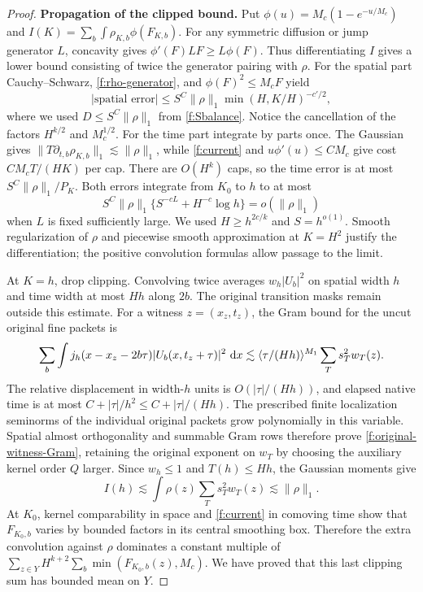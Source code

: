 \begin{proof}
\smallskip\noindent\textbf{Propagation of the clipped bound.}
Put $\phi(u)=M_c(1-e^{-u/M_c})$ and
$I(K)=\sum_b\int\rho_{K,b}\phi(F_{K,b})$. For any symmetric
diffusion or jump generator $L$, concavity gives
$\phi'(F)LF\ge L\phi(F)$. Thus differentiating $I$ gives a lower
bound consisting of twice the generator pairing with $\rho$.
For the spatial part Cauchy--Schwarz, \eqref{f:rho-generator}, and
$\phi(F)^2\le M_cF$ yield
\[
 |\text{spatial error}|
 \le S^C\|\rho\|_1\min(H,K/H)^{-c'/2},
\]
where we used $D\le S^C\|\rho\|_1$ from \eqref{f:Sbalance}.
Notice the cancellation of the factors $H^{k/2}$ and $M_c^{1/2}$.
For the time part integrate by parts once. The Gaussian gives
$\|T\partial_{t,b}\rho_{K,b}\|_1\lesssim\|\rho\|_1$, while
\eqref{f:current} and $u\phi'(u)\le CM_c$ give cost
$CM_cT/(HK)$ per cap. There are $O(H^k)$ caps, so the time error is
at most $S^C\|\rho\|_1/P_K$. Both errors integrate from $K_0$ to $h$
to at most
\[
 S^C\|\rho\|_1\{S^{-cL}+H^{-c}\log h\}=o(\|\rho\|_1)
\]
when $L$ is fixed sufficiently large. We used $H\ge h^{2c/k}$ and
$S=h^{o(1)}$. Smooth regularization of $\rho$ and piecewise smooth
approximation at $K=H^2$ justify the differentiation; the positive
convolution formulas allow passage to the limit.

At $K=h$, drop clipping. Convolving twice averages $w_h|U_b|^2$ on
spatial width $h$ and time width at most $Hh$ along $2b$. The original
transition masks remain outside this estimate. For a witness
$z=(x_z,t_z)$, the Gram bound for the uncut original fine packets is
\begin{equation}\label{f:original-witness-Gram}
 \sum_b\int j_h(x-x_z-2b\tau)|U_b(x,t_z+\tau)|^2\,\,\mathrm d x
 \lesssim\langle \tau/(Hh)\rangle^{M_1}\sum_Ts_T^2w_T(z).
\end{equation}
The relative displacement in width-$h$ units is $O(|\tau|/(Hh))$,
and elapsed native time is at most
$C+|\tau|/h^2\le C+|\tau|/(Hh)$. The prescribed finite localization
seminorms of the individual original packets grow polynomially in
this variable. Spatial almost orthogonality and summable Gram rows
therefore prove \eqref{f:original-witness-Gram}, retaining the original
exponent on $w_T$ by choosing the auxiliary kernel order $Q$ larger.
Since $w_h\le1$ and $T(h)\le Hh$, the Gaussian moments give
\[
 I(h)\lesssim\int\rho(z)\sum_Ts_T^2w_T(z)\lesssim\|\rho\|_1.
\]
At $K_0$, kernel comparability in space and \eqref{f:current} in
comoving time show that $F_{K_0,b}$ varies by bounded factors in
its central smoothing box. Therefore the extra convolution against
$\rho$ dominates a constant multiple of
$\sum_{z\in Y}H^{k+2}\sum_b\min(F_{K_0,b}(z),M_c)$.
We have proved that this last clipping sum has bounded mean on $Y$.


\end{proof}
